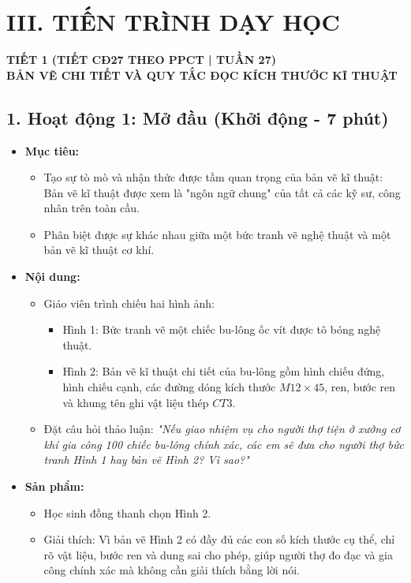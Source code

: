 \documentclass[12pt, a4paper]{article}
\begin{document}
\section*{III. TIẾN TRÌNH DẠY HỌC}

\begin{center}
    \textbf{\large TIẾT 1 (TIẾT CĐ27 THEO PPCT | TUẦN 27)}\\[4pt]
    \textbf{\large BẢN VẼ CHI TIẾT VÀ QUY TẮC ĐỌC KÍCH THƯỚC KĨ THUẬT}
\end{center}

\subsection*{1. Hoạt động 1: Mở đầu (Khởi động - 7 phút)}

\begin{itemize}[leftmargin=1.2cm]
    \item[a)] \textbf{Mục tiêu:}
    \begin{itemize}[leftmargin=0.6cm]
        \item Tạo sự tò mò và nhận thức được tầm quan trọng của bản vẽ kĩ thuật: Bản vẽ kĩ thuật được xem là "ngôn ngữ chung" của tất cả các kỹ sư, công nhân trên toàn cầu.
        \item Phân biệt được sự khác nhau giữa một bức tranh vẽ nghệ thuật và một bản vẽ kĩ thuật cơ khí.
    \end{itemize}

    \item[b)] \textbf{Nội dung:}
    \begin{itemize}[leftmargin=0.6cm]
        \item Giáo viên trình chiếu hai hình ảnh:
        \begin{itemize}
            \item Hình 1: Bức tranh vẽ một chiếc bu-lông ốc vít được tô bóng nghệ thuật.
            \item Hình 2: Bản vẽ kĩ thuật chi tiết của bu-lông gồm hình chiếu đứng, hình chiếu cạnh, các đường dóng kích thước $M12 \times 45$, ren, bước ren và khung tên ghi vật liệu thép $CT3$.
        \end{itemize}
        \item Đặt câu hỏi thảo luận: \textit{"Nếu giao nhiệm vụ cho người thợ tiện ở xưởng cơ khí gia công 100 chiếc bu-lông chính xác, các em sẽ đưa cho người thợ bức tranh Hình 1 hay bản vẽ Hình 2? Vì sao?"}
    \end{itemize}

    \item[c)] \textbf{Sản phẩm:}
    \begin{itemize}[leftmargin=0.6cm]
        \item Học sinh đồng thanh chọn Hình 2.
        \item Giải thích: Vì bản vẽ Hình 2 có đầy đủ các con số kích thước cụ thể, chỉ rõ vật liệu, bước ren và dung sai cho phép, giúp người thợ đo đạc và gia công chính xác mà không cần giải thích bằng lời nói.
    \end{itemize}


\end{itemize}
\end{document}
